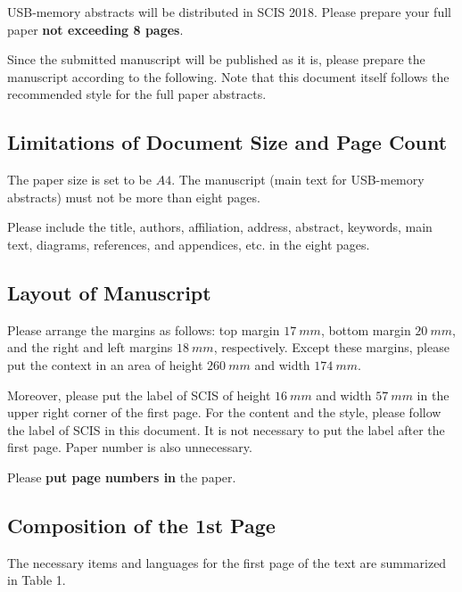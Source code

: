 \documentclass[a4paper]{article}
\begin{document}
USB-memory abstracts will be distributed in SCIS 2018. Please prepare your full paper {\bf not exceeding 8 pages}.

Since the submitted manuscript will be published as it is, please prepare the manuscript according to the following.
Note that this document itself follows the recommended style for the full paper abstracts.

\subsection{Limitations of Document Size and Page Count}

The paper size is set to be $A4$. The manuscript (main text for USB-memory abstracts) must not be more than eight pages.

Please include the title, authors, affiliation, address, abstract, keywords, main text, diagrams, references, and appendices, etc. in the eight pages.

\subsection{Layout of Manuscript}

Please arrange the margins as follows: top margin $17~ mm$, bottom margin $20~ mm$, and the right and left margins $18~ mm$, respectively. Except these margins,
please put the context in an area of height $260~ mm$ and width $174~ mm$.

Moreover, please put the label of SCIS of height $16~ mm$ and width $57~ mm$ in the upper right corner of the first page. For the content and the style,
please follow the label of SCIS in this document. It is not necessary to put the label after the first page. Paper number is also unnecessary.

Please {\bf put page numbers in} the paper.

\subsection{Composition of the 1st Page}

The necessary items and languages for the first page of the text are summarized in Table 1.
\end{document}

